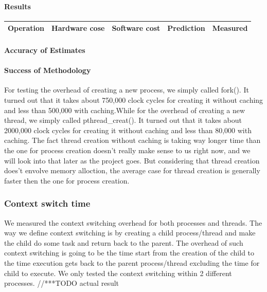 \paragraph{Results}

\begin{tabular}{| l | l | l | l | l |}
\hline
Operation & Hardware cose & Software cost & Prediction & Measured \\
\hline
\end{tabular}
\paragraph{Accuracy of Estimates}
\paragraph{Success of Methodology}
For testing the overhead of creating a new process, we simply called fork(). It turned out that it takes about 750,000 clock cycles for creating it without caching and less than 500,000 with caching.While for the overhead of creating a new thread, we simply called pthread\_creat(). It turned out that it takes about 2000,000 clock cycles for creating it without caching and less than 80,000 with caching.
The fact thread creation without caching is taking way longer time than the one for process creation doesn't really make sense to us right now, and we will look into that later as the project goes. But considering that thread creation does't envolve memory alloction, the average case for thread creation is generally faster then the one for process creation.


\subsubsection{Context switch time}
We measured the context switching overhead for both processes and threads. The way we define context switching is by creating a child process/thread and make the child do some task and return back to the parent. The overhead of such context switching is going to be the time start from the creation of the child to the time execution gets back to the parent process/thread excluding the time for child to execute. We only tested the context switching within 2 different processes.
//***TODO actual result


